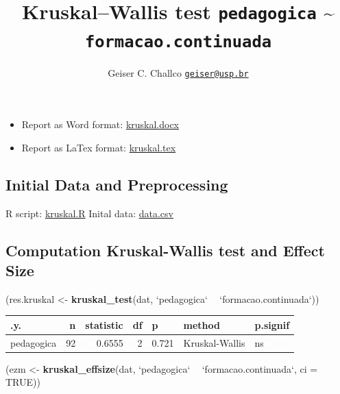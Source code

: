 \documentclass[]{article}
\title{Kruskal--Wallis test \texttt{pedagogica} \textasciitilde{}
\texttt{formacao.continuada}}
\author{Geiser C. Challco \href{mailto:geiser@usp.br}{\nolinkurl{geiser@usp.br}}}
\date{}
\newenvironment{Shaded}{\begin{snugshade}}{\end{snugshade}}
\newcommand{\DataTypeTok}[1]{\textcolor[rgb]{0.13,0.29,0.53}{#1}}
\newcommand{\KeywordTok}[1]{\textcolor[rgb]{0.13,0.29,0.53}{\textbf{#1}}}
\newcommand{\NormalTok}[1]{#1}
\newcommand{\OperatorTok}[1]{\textcolor[rgb]{0.81,0.36,0.00}{\textbf{#1}}}
\newcommand{\OtherTok}[1]{\textcolor[rgb]{0.56,0.35,0.01}{#1}}
\newcommand{\StringTok}[1]{\textcolor[rgb]{0.31,0.60,0.02}{#1}}
\providecommand{\tightlist}{%
  \setlength{\itemsep}{0pt}\setlength{\parskip}{0pt}}
\begin{document}
\maketitle

\begin{itemize}
\tightlist
\item
  Report as Word format: \url{kruskal.docx}
\item
  Report as LaTex format: \url{kruskal.tex}
\end{itemize}

\hypertarget{initial-data-and-preprocessing}{%
\subsection{Initial Data and
Preprocessing}\label{initial-data-and-preprocessing}}

R script: \url{kruskal.R} Inital data: \url{data.csv}

\hypertarget{computation-kruskal-wallis-test-and-effect-size}{%
\subsection{Computation Kruskal-Wallis test and Effect
Size}\label{computation-kruskal-wallis-test-and-effect-size}}

\begin{Shaded}
\begin{Highlighting}[]
\NormalTok{(res.kruskal <-}\StringTok{ }\KeywordTok{kruskal_test}\NormalTok{(dat, }\StringTok{`}\DataTypeTok{pedagogica}\StringTok{`} \OperatorTok{~}\StringTok{ `}\DataTypeTok{formacao.continuada}\StringTok{`}\NormalTok{))}
\end{Highlighting}
\end{Shaded}

\begin{longtable}[]{@{}lrrrlll@{}}
\toprule
.y. & n & statistic & df & p & method & p.signif\tabularnewline
\midrule
\endhead
pedagogica & 92 & 0.6555 & 2 & 0.721 & Kruskal-Wallis &
ns\tabularnewline
\bottomrule
\end{longtable}

\begin{Shaded}
\begin{Highlighting}[]
\NormalTok{(ezm <-}\StringTok{ }\KeywordTok{kruskal_effsize}\NormalTok{(dat, }\StringTok{`}\DataTypeTok{pedagogica}\StringTok{`} \OperatorTok{~}\StringTok{ `}\DataTypeTok{formacao.continuada}\StringTok{`}\NormalTok{, }\DataTypeTok{ci =} \OtherTok{TRUE}\NormalTok{))}
\end{Highlighting}
\end{Shaded}
\end{document}
